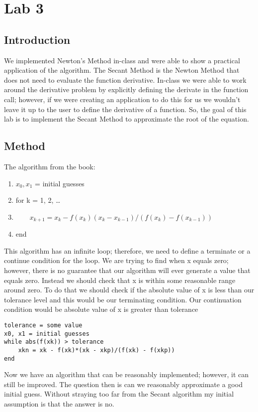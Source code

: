 \section{Lab 3}
\subsection{Introduction}
We implemented Newton's Method in-class and were able to show a practical application of the algorithm. The Secant Method is the Newton Method that does not need to evaluate the function derivative. In-class we were able to work around the derivative problem by explicitly defining the derivate in the function call; however, if we were creating an application to do this for us we wouldn't leave it up to the user to define the derivative of a function. So, the goal of this lab is to implement the Secant Method to approximate the root of the equation.
\subsection{Method}
The algorithm from the book:
\begin{enumerate}
\item $x_0, x_1$ = initial guesses
\item for k = 1, 2, \ldots
\item ~~~~$x_{k+1} = x_k - f(x_k)(x_k - x_{k-1})/(f(x_k) - f(x_{k-1}))$
\item end
\end{enumerate}
This algorithm has an infinite loop; therefore, we need to define a terminate or a continue condition for the loop. We are trying to find when x equals zero; however, there is no guarantee that our algorithm will ever generate a value that equals zero. Instead we should check that x is within some reasonable range around zero. To do that we should check if the absolute value of x is less than our tolerance level and this would be our terminating condition. Our continuation condition would be absolute value of x is greater than tolerance
\begin{lstlisting}[caption=algorithm with terminating condition]
tolerance = some value
x0, x1 = initial guesses
while abs(f(xk)) > tolerance
	xkn = xk - f(xk)*(xk - xkp)/(f(xk) - f(xkp))
end
\end{lstlisting}
Now we have an algorithm that can be reasonably implemented; however, it can still be improved. The question then is can we reasonably approximate a good initial guess. Without straying too far from the Secant algorithm my initial assumption is that the answer is no.
